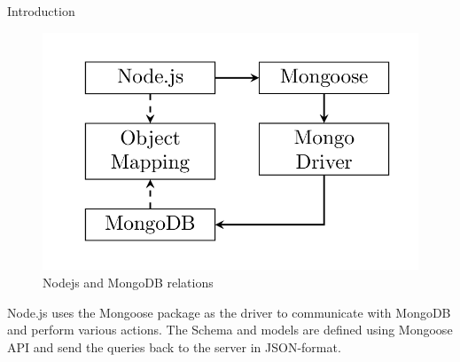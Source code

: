 \begin{block}{Introduction}
\begin{itemize}
        \begin{figure}
            \includegraphics[width=0.8\linewidth]{backend.png}
            \caption{Nodejs and MongoDB relations}
        \end{figure}
        \vspace{-2.3cm}
        Node.js uses the Mongoose package as the driver to communicate with MongoDB and perform various actions. The Schema and models are defined using Mongoose API and send the queries back to the server in JSON-format.
    \end{itemize}
\end{block}